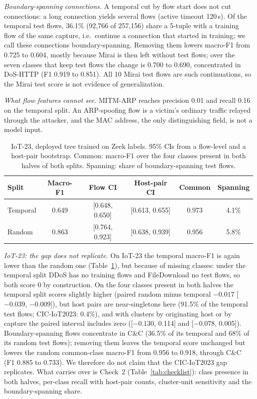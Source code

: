 \emph{Boundary-spanning connections.} A temporal cut by flow start does not cut connections: a long connection yields several flows (active timeout 120\,s). Of the temporal test flows, 36.1\% (92,766 of 257,156) share a 5-tuple with a training flow of the same capture, i.e.\ continue a connection that started in training; we call these connections boundary-spanning. Removing them lowers macro-F1 from 0.725 to 0.604, mostly because Mirai is then left without test flows; over the seven classes that keep test flows the change is 0.700 to 0.690, concentrated in DoS-HTTP (F1 0.919 to 0.851). All 10 Mirai test flows are such continuations, so the Mirai test score is not evidence of generalization.

\emph{What flow features cannot see.} MITM-ARP reaches precision 0.01 and recall 0.16 on the temporal split. An ARP-spoofing flow is a victim's ordinary traffic relayed through the attacker, and the MAC address, the only distinguishing field, is not a model input.

\begin{table}[t]
\centering
\caption{IoT-23, deployed tree trained on Zeek labels. 95\% CIs from a flow-level and a host-pair bootstrap. Common: macro-F1 over the four classes present in both halves of both splits. Spanning: share of boundary-spanning test flows.}
\label{tab:iot23split}
\footnotesize
\setlength{\tabcolsep}{2.5pt}
\begin{tabular}{lccccc}
\hline
Split & Macro-F1 & Flow CI & Host-pair CI & Common & Spanning \\
\hline
Temporal & 0.649 & [0.648, 0.650] & [0.613, 0.655] & 0.973 & 4.1\% \\
Random   & 0.863 & [0.764, 0.923] & [0.638, 0.939] & 0.956 & 5.8\% \\
\hline
\end{tabular}
\end{table}

\emph{IoT-23: the gap does not replicate.} On IoT-23 the temporal macro-F1 is again lower than the random one (Table~\ref{tab:iot23split}), but because of missing classes: under the temporal split DDoS has no training flows and FileDownload no test flows, so both score 0 by construction. On the four classes present in both halves the temporal split scores slightly higher (paired random minus temporal $-0.017$ [$-0.039$, $-0.009$]), but host pairs are near-singletons here (91.5\% of the temporal test flows; CIC-IoT2023: 0.4\%), and with clusters by originating host or by capture the paired interval includes zero ([$-0.130$, 0.114] and [$-0.078$, 0.005]). Boundary-spanning flows concentrate in C\&C (36.5\% of its temporal and 68\% of its random test flows); removing them leaves the temporal score unchanged but lowers the random common-class macro-F1 from 0.956 to 0.918, through C\&C (F1 0.885 to 0.733). We therefore do not claim that the CIC-IoT2023 gap replicates. What carries over is Check~2 (Table~\ref{tab:checklist}): class presence in both halves, per-class recall with host-pair counts, cluster-unit sensitivity and the boundary-spanning share.
